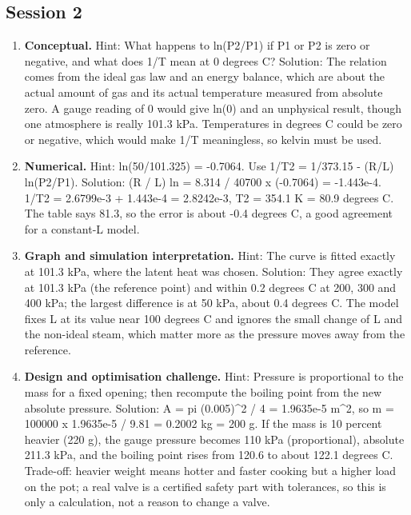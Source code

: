 \documentclass[11pt,a4paper]{article}
\begin{document}
\subsection*{Session 2}
\begin{enumerate}[nosep]
\item \textbf{Conceptual.} Hint: What happens to ln(P2/P1) if P1 or P2 is zero or negative, and what does 1/T mean at 0 degrees C? Solution: The relation comes from the ideal gas law and an energy balance, which are about the actual amount of gas and its actual temperature measured from absolute zero. A gauge reading of 0 would give ln(0) and an unphysical result, though one atmosphere is really 101.3 kPa. Temperatures in degrees C could be zero or negative, which would make 1/T meaningless, so kelvin must be used.
\item \textbf{Numerical.} Hint: ln(50/101.325) = -0.7064. Use 1/T2 = 1/373.15 - (R/L) ln(P2/P1). Solution: (R / L) ln = 8.314 / 40700 x (-0.7064) = -1.443e-4. 1/T2 = 2.6799e-3 + 1.443e-4 = 2.8242e-3, T2 = 354.1 K = 80.9 degrees C. The table says 81.3, so the error is about -0.4 degrees C, a good agreement for a constant-L model.
\item \textbf{Graph and simulation interpretation.} Hint: The curve is fitted exactly at 101.3 kPa, where the latent heat was chosen. Solution: They agree exactly at 101.3 kPa (the reference point) and within 0.2 degrees C at 200, 300 and 400 kPa; the largest difference is at 50 kPa, about 0.4 degrees C. The model fixes L at its value near 100 degrees C and ignores the small change of L and the non-ideal steam, which matter more as the pressure moves away from the reference.
\item \textbf{Design and optimisation challenge.} Hint: Pressure is proportional to the mass for a fixed opening; then recompute the boiling point from the new absolute pressure. Solution: A = pi (0.005)\textasciicircum{}2 / 4 = 1.9635e-5 m\textasciicircum{}2, so m = 100000 x 1.9635e-5 / 9.81 = 0.2002 kg = 200 g. If the mass is 10 percent heavier (220 g), the gauge pressure becomes 110 kPa (proportional), absolute 211.3 kPa, and the boiling point rises from 120.6 to about 122.1 degrees C. Trade-off: heavier weight means hotter and faster cooking but a higher load on the pot; a real valve is a certified safety part with tolerances, so this is only a calculation, not a reason to change a valve.
\end{enumerate}
\end{document}
